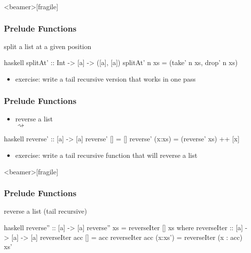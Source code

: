 \documentclass[dvipsnames]{beamer}
\theoremstyle{plain}
\begin{document}
\begin{frame}<beamer>[fragile]
  \frametitle{Prelude Functions}

  \begin{exampleblock}{split a list at a given position}
    \begin{pygments}{haskell}
splitAt' :: Int -> [a] -> ([a], [a])
splitAt' n xs = (take' n xs, drop' n xs)
    \end{pygments}
  \end{exampleblock}

  \pause
  \begin{itemize}
    \item exercise: write a tail recursive version that works in one pass
  \end{itemize}
\end{frame}

\begin{frame}[fragile]
  \frametitle{Prelude Functions}

  \begin{itemize}
    \item reverse a list\\
       $\rightsquigarrow$
  \end{itemize}

  \begin{exampleblock}{}
    \begin{pygments}{haskell}
reverse' :: [a] -> [a]
reverse' []     = []
reverse' (x:xs) = (reverse' xs) ++ [x]
    \end{pygments}
  \end{exampleblock}

  \pause
  \begin{itemize}
    \item exercise: write a tail recursive function that will reverse a list
  \end{itemize}
\end{frame}

\begin{frame}<beamer>[fragile]
  \frametitle{Prelude Functions}

  \begin{exampleblock}{reverse a list (tail recursive)}
    \begin{pygments}{haskell}
reverse'' :: [a] -> [a]
reverse'' xs = reverseIter [] xs
  where
    reverseIter :: [a] -> [a] -> [a]
    reverseIter acc []      = acc
    reverseIter acc (x:xs') = reverseIter (x : acc) xs'
    \end{pygments}
  \end{exampleblock}
\end{frame}
\end{document}
